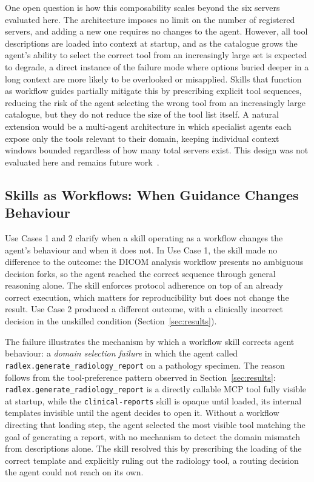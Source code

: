\documentclass[conference]{IEEEtran}
\begin{document}
One open question is how this composability scales beyond the six servers evaluated here. The architecture imposes no limit on the number of registered servers, and adding a new one requires no changes to the agent. However, all tool descriptions are loaded into context at startup, and as the catalogue grows the agent's ability to select the correct tool from an increasingly large set is expected to degrade, a direct instance of the failure mode where options buried deeper in a long context are more likely to be overlooked or misapplied. Skills that function as workflow guides partially mitigate this by prescribing explicit tool sequences, reducing the risk of the agent selecting the wrong tool from an increasingly large catalogue, but they do not reduce the size of the tool list itself. A natural extension would be a multi-agent architecture in which specialist agents each expose only the tools relevant to their domain, keeping individual context windows bounded regardless of how many total servers exist. This design was not evaluated here and remains future work~\cite{klang2026orchestrated}.

\subsection{Skills as Workflows: When Guidance Changes Behaviour}

Use Cases 1 and 2 clarify when a skill operating as a workflow changes the agent's behaviour and when it does not. In Use Case 1, the skill made no difference to the outcome: the DICOM analysis workflow presents no ambiguous decision forks, so the agent reached the correct sequence through general reasoning alone. The skill enforces protocol adherence on top of an already correct execution, which matters for reproducibility but does not change the result. Use Case 2 produced a different outcome, with a clinically incorrect decision in the unskilled condition (Section~\ref{sec:results}).

The failure illustrates the mechanism by which a workflow skill corrects agent behaviour: a \emph{domain selection failure} in which the agent called \texttt{radlex.generate\_radiology\_report} on a pathology specimen. The reason follows from the tool-preference pattern observed in Section~\ref{sec:results}: \texttt{radlex.generate\_radiology\_report} is a directly callable MCP tool fully visible at startup, while the \texttt{clinical-reports} skill is opaque until loaded, its internal templates invisible until the agent decides to open it. Without a workflow directing that loading step, the agent selected the most visible tool matching the goal of generating a report, with no mechanism to detect the domain mismatch from descriptions alone. The skill resolved this by prescribing the loading of the correct template and explicitly ruling out the radiology tool, a routing decision the agent could not reach on its own.
\end{document}

